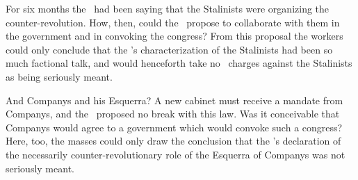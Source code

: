For six months the \POUM\ had been saying that the Stalinists were organizing the counter-revolution. How, then, could the \POUM\ propose to collaborate with them in the government and in convoking the congress? From this proposal the workers could only conclude that the \POUM’s characterization of the Stalinists had been so much factional talk, and would henceforth take no \POUM\ charges against the Stalinists as being seriously meant.

And Companys and his Esquerra? A new cabinet must receive a mandate from Companys, and the \POUM\ proposed no break with this law. Was it conceivable that Companys would agree to a government which would convoke such a congress? Here, too, the masses could only draw the conclusion that the \POUM’s declaration of the necessarily counter-revolutionary role of the Esquerra of Companys was not seriously meant.